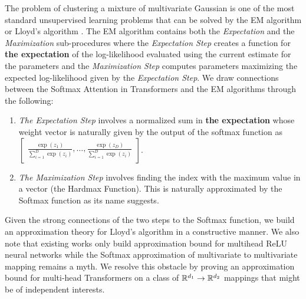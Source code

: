 The problem of clustering a mixture of multivariate Gaussian is one of the most standard unsupervised learning problems \citep{bishop2006pattern} that can be solved by the EM algorithm or Lloyd's algorithm \citep{lloyd1982least}. The EM algorithm contains both the \emph{Expectation} and the \emph{Maximization} sub-procedures where the \emph{Expectation Step} creates a function for \textbf{the expectation} of the log-likelihood evaluated using the current estimate for the parameters and the \emph{Maximization Step} computes parameters maximizing the expected log-likelihood given by the \emph{Expectation Step}. We draw connections between the Softmax Attention in Transformers and the EM algorithms through the following:
\begin{enumerate}
    \item \emph{The Expectation Step} involves a normalized sum in \textbf{the expectation} whose weight vector is naturally given by the output of the softmax function as 
    $\begin{bmatrix}
        \frac{\exp(z_1)}{\sum_{i=1}^D\exp(z_i)},\ldots,\frac{\exp(z_D)}{\sum_{i=1}^D\exp(z_i)}
    \end{bmatrix}$.
    \item \emph{The Maximization Step} involves finding the index with the maximum value in a vector (the Hardmax Function). This is naturally approximated by the Softmax function as its name suggests.
\end{enumerate}
Given the strong connections of the two steps to the Softmax function, we build an approximation theory for Lloyd's algorithm in a constructive manner. We also note that existing works only build approximation bound for multihead ReLU neural networks \citep{bach2017breaking} while the Softmax approximation of multivariate to multivariate mapping remains a myth. We resolve this obstacle by proving an approximation bound for multi-head Transformers on a class of $\mathbb{R}^{d_1}\to\mathbb{R}^{d_2}$ mappings that might be of independent interests.



